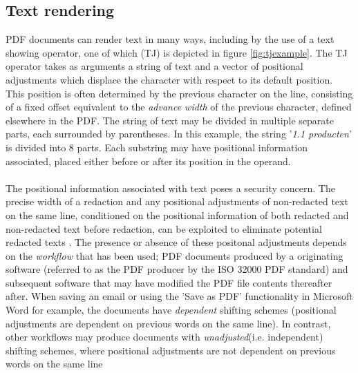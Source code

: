 \subsection{Text rendering}
PDF documents can render text in many ways, including by the use of a text showing operator, one of which (TJ) is depicted in figure \ref{fig:tjexample}. The TJ operator takes as arguments a string of text and a vector of positional adjustments which displace the character with respect to its default position. This position is often determined by the previous character on the line, consisting of a fixed offset equivalent to the \textit{advance width} of the previous character, defined elsewhere in the PDF. The string of text may be divided in multiple separate parts, each surrounded by parentheses. In this example, the string '\textit{1.1 producten}' is divided into 8 parts. Each substring may have positional information associated, placed either before or after its position in the operand. 
\\\\
The positional information associated with text poses a security concern. The precise width of a redaction and any positional adjustments of non-redacted text on the same line, conditioned on the positional information of both redacted and non-redacted text before redaction, can be exploited to eliminate potential redacted texts \cite{bland2022story}. The presence or absence of these positonal adjustments depends on the \textit{workflow} that has been used; PDF documents produced by a originating software (referred to as the PDF producer by the ISO 32000 PDF standard) and subsequent software that may have modified the PDF file contents thereafter after. When saving an email or using the 'Save as PDF' functionality in Microsoft Word for example, the documents have \textit{dependent} shifting schemes (positional adjustments are dependent on previous words on the same line). In contrast, other workflows may produce documents with \textit{unadjusted}(i.e. independent) shifting schemes, where positional adjustments are not dependent on previous words on the same line
